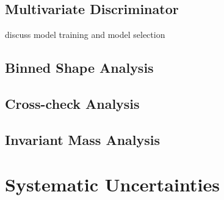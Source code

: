 \subsection{Multivariate Discriminator}

discuss model training and model selection

\subsection{Binned Shape Analysis}

\subsection{Cross-check Analysis}

\subsection{Invariant Mass Analysis}

\section{Systematic Uncertainties}

%
%
%
%
